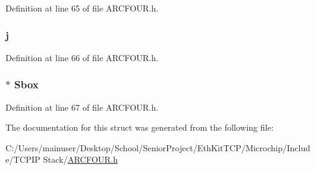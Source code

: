 Definition at line 65 of file A\+R\+C\+F\+O\+U\+R.\+h.

\hypertarget{struct_a_r_c_f_o_u_r___c_t_x_adf3ec87d99134b28195e674943a02d46}{}
\subsubsection[{j}]{ j}\label{struct_a_r_c_f_o_u_r___c_t_x_adf3ec87d99134b28195e674943a02d46}


Definition at line 66 of file A\+R\+C\+F\+O\+U\+R.\+h.

\hypertarget{struct_a_r_c_f_o_u_r___c_t_x_a6cb957a7a561db9bdb4d22d191aa59ee}{}
\subsubsection[{Sbox}]{$\ast$ Sbox}\label{struct_a_r_c_f_o_u_r___c_t_x_a6cb957a7a561db9bdb4d22d191aa59ee}


Definition at line 67 of file A\+R\+C\+F\+O\+U\+R.\+h.



The documentation for this struct was generated from the following file\+:\begin{DoxyCompactItemize}
\item 
C\+:/\+Users/mainuser/\+Desktop/\+School/\+Senior\+Project/\+Eth\+Kit\+T\+C\+P/\+Microchip/\+Include/\+T\+C\+P\+I\+P Stack/\hyperlink{_a_r_c_f_o_u_r_8h}{A\+R\+C\+F\+O\+U\+R.\+h}\end{DoxyCompactItemize}
